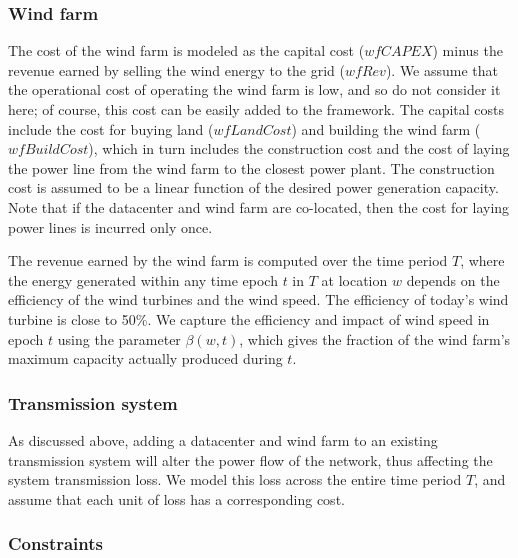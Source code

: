 \subsubsection{Wind farm}  The cost of the wind farm is modeled as the capital cost ($wfCAPEX$) minus the revenue earned by selling the wind energy to the grid ($wfRev$).  We assume that the operational cost of operating the wind farm is low, and so do not consider it here; of course, this cost can be easily added to the framework.  The capital costs include the cost for buying land ($wfLandCost$) and building the wind farm ($wfBuildCost$), which in turn includes the construction cost and the cost of laying the power line from the wind farm to the closest power plant.  The construction cost is assumed to be a linear function of the desired power generation capacity.  Note that if the datacenter and wind farm are co-located, then the cost for laying power lines is incurred only once.

The revenue earned by the wind farm is computed over the time period $T$, where the energy generated within any time epoch $t$ in $T$ at location $w$ depends on the efficiency of the wind turbines and the wind speed.  The efficiency of today's wind turbine is close to 50\%.  We capture the efficiency and impact of wind speed in epoch $t$ using the parameter $\beta(w,t)$, which gives the fraction of the wind farm's maximum capacity actually produced during $t$.

\subsubsection{Transmission system} As discussed above, adding a datacenter and wind farm to an existing transmission system will alter the power flow of the network, thus affecting the system transmission loss.  We model this loss across the entire time period $T$, and assume that each unit of loss has a corresponding cost.



\subsubsection{Constraints}

